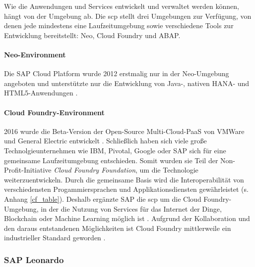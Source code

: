 \noindent Wie die Anwendungen und Services entwickelt und verwaltet werden können, hängt von der Umgebung ab. Die \ac{scp} stellt drei Umgebungen zur Verfügung, von denen jede mindestens eine Laufzeitumgebung sowie verschiedene Tools zur Entwicklung bereitstellt: Neo, Cloud Foundry und ABAP.

\paragraph{Neo-Environment} Die SAP Cloud Platform wurde 2012 erstmalig nur in der Neo-Umgebung angeboten und unterstützte nur die Entwicklung von Java-, nativen HANA- und HTML5-Anwendungen \citep{Elsner2018}.

\paragraph{Cloud Foundry-Environment} 2016 wurde die Beta-Version der Open-Source Multi-Cloud-PaaS von VMWare und General Electric entwickelt \citep{Utecht2018}. Schließlich haben sich viele große Technolgieunternehmen wie IBM, Pivotal, Google oder SAP sich für eine gemeinsame Laufzeitumgebung entschieden. Somit wurden sie Teil der Non-Profit-Initiative \textit{Cloud Foundry Foundation}, um die Technologie weiterzuentwickeln. Durch die gemeinsame Basis wird die Interoperabilität von verschiedensten Progammiersprachen und Applikationsdiensten gewährleistet (s. Anhang \ref{cf_table}).  Deshalb ergänzte SAP die \ac{scp} um die Cloud Foundry-Umgebung, in der die Nutzung von Services für das Internet der Dinge, Blockchain oder Machine Learning möglich ist \citep{Elsner2018}. Aufgrund der Kollaboration und den daraus entstandenen Möglichkeiten ist Cloud Foundry mittlerweile ein industrieller Standard geworden \citep{Acharya2019}.

\subsubsection{SAP Leonardo}

